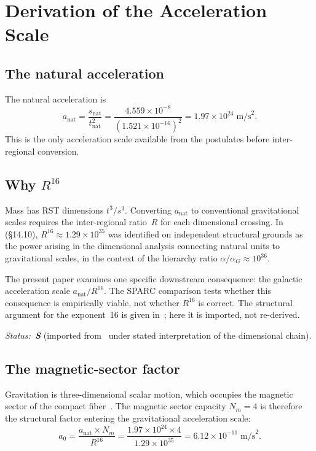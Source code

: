 \documentclass[11pt,a4paper]{article}
\begin{document}
\section{Derivation of the Acceleration Scale}
\label{sec:accel-scale}

\subsection{The natural acceleration}

The natural acceleration is
\begin{equation}
\label{eq:a-nat}
a_{\mathrm{nat}} = \frac{s_{\mathrm{nat}}}{t_{\mathrm{nat}}^2} = \frac{4.559 \times 10^{-8}}{(1.521 \times 10^{-16})^2} = 1.97 \times 10^{24} \;\text{m/s}^2.
\end{equation}
This is the only acceleration scale available from the postulates before inter-regional conversion.

\subsection{Why $R^{16}$}
\label{sec:R16}

Mass has RST dimensions $t^3/s^3$.
Converting $a_{\mathrm{nat}}$ to conventional gravitational scales requires the inter-regional ratio~$R$ for each dimensional crossing.
In~\cite{Wells2026c} (\S14.10), $R^{16} \approx 1.29 \times 10^{35}$ was identified on independent structural grounds as the power arising in the dimensional analysis connecting natural units to gravitational scales, in the context of the hierarchy ratio $\alpha/\alpha_G \approx 10^{36}$.

The present paper examines one specific downstream consequence: the galactic acceleration scale $a_{\mathrm{nat}}/R^{16}$.
The SPARC comparison tests whether this consequence is empirically viable, not whether $R^{16}$ is correct.
The structural argument for the exponent~16 is given in~\cite{Wells2026c}; here it is imported, not re-derived.

\textit{Status:~\textbf{S}} (imported from~\cite{Wells2026c} under stated interpretation of the dimensional chain).

\subsection{The magnetic-sector factor}
\label{sec:Nm}

Gravitation is three-dimensional scalar motion, which occupies the magnetic sector of the compact fiber~\cite{Wells2026a}.
The magnetic sector capacity $N_m = 4$ is therefore the structural factor entering the gravitational acceleration scale:
\begin{equation}
\label{eq:a0}
a_0 = \frac{a_{\mathrm{nat}} \times N_m}{R^{16}} = \frac{1.97 \times 10^{24} \times 4}{1.29 \times 10^{35}} = 6.12 \times 10^{-11} \;\text{m/s}^2.
\end{equation}
\end{document}
